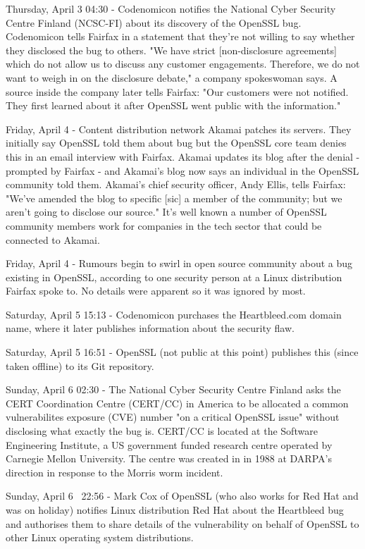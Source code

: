 Thursday, April 3 04:30 - Codenomicon notifies the National Cyber Security Centre Finland (NCSC-FI) about its discovery of the OpenSSL bug. Codenomicon tells Fairfax in a statement that they're not willing to say whether they disclosed the bug to others. "We have strict [non-disclosure agreements] which do not allow us to discuss any customer engagements. Therefore, we do not want to weigh in on the disclosure debate," a company spokeswoman says. A source inside the company later tells Fairfax: "Our customers were not notified. They first learned about it after OpenSSL went public with the information."

Friday, April 4 - Content distribution network Akamai patches its servers. They initially say OpenSSL told them about bug but the OpenSSL core team denies this in an email interview with Fairfax. Akamai updates its blog after the denial - prompted by Fairfax - and Akamai's blog now says an individual in the OpenSSL community told them. Akamai's chief security officer, Andy Ellis, tells Fairfax: "We've amended the blog to specific [sic] a member of the community; but we aren't going to disclose our source."  It's well known a number of OpenSSL community members work for companies in the tech sector that could be connected to Akamai.

Friday, April 4 - Rumours begin to swirl in open source community about a bug existing in OpenSSL, according to one security person at a Linux distribution Fairfax spoke to. No details were apparent so it was ignored by most.

Saturday, April 5 15:13 - Codenomicon purchases the Heartbleed.com domain name, where it later publishes information about the security flaw.

Saturday, April 5 16:51 - OpenSSL (not public at this point) publishes this (since taken offline) to its Git repository.

Sunday, April 6 02:30 - The National Cyber Security Centre Finland asks the CERT Coordination Centre (CERT/CC) in America to be allocated a common vulnerabilites exposure (CVE) number "on a critical OpenSSL issue" without disclosing what exactly the bug is. CERT/CC is located at the Software Engineering Institute, a US government funded research centre operated by Carnegie Mellon University. The centre was created in in 1988 at DARPA's direction in response to the Morris worm incident.

Sunday,  April 6 ~22:56 - Mark Cox of OpenSSL (who also works for Red Hat and was on holiday) notifies Linux distribution Red Hat about the Heartbleed bug and authorises them to share details of the vulnerability on behalf of OpenSSL to other Linux operating system distributions.

